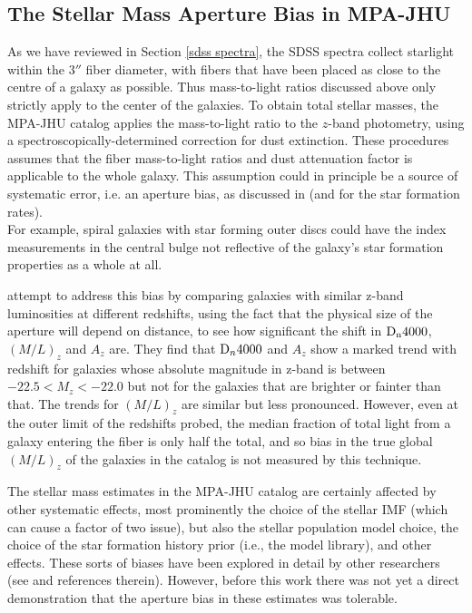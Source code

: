 \subsection{The Stellar Mass Aperture Bias in MPA-JHU}
\label{apercorr}

As we have reviewed in Section \ref{sdss spectra}, the SDSS spectra 
collect starlight within the 3$''$ fiber diameter, with fibers that 
have been placed as close to the centre of a galaxy as possible.
Thus mass-to-light ratios discussed above only strictly apply to the
center of the galaxies.
To obtain total stellar masses, the MPA-JHU catalog 
applies the mass-to-light ratio to the $z$-band photometry, using
a spectroscopically-determined correction for dust extinction.
These procedures assumes that the fiber mass-to-light ratios and 
dust attenuation factor is applicable to the whole galaxy. This
assumption could in principle be a source of systematic error,
i.e. an  aperture bias, as discussed in \citet{kauffmann_stellar_2003} 
(and \citet{brinchmann_physical_2004} for the star formation rates).\\
For example,  spiral galaxies with star forming outer discs could have 
the index measurements in the central bulge not reflective of the 
galaxy's star formation properties as a whole at all. 

\citet{kauffmann_stellar_2003} attempt to address this 
bias by comparing galaxies with similar z-band luminosities 
at different redshifts, using the fact that the physical
size of the aperture will depend on distance,
to see how significant the shift in ${\rm D}_{\rm n}4000$,
$(M/L)_{z}$ and $A_{z}$ are. They find that ${\rm D}_{n}4000$ 
and $A_{z}$ show a marked trend with redshift for galaxies 
whose absolute magnitude in z-band is between 
$-22.5 < M_{z} < -22.0$  but not for the galaxies that are 
brighter or fainter than that. The trends for $(M/L)_{z}$ are 
similar but less pronounced. However, even at the outer limit 
of the redshifts probed, the median fraction of total light 
from a galaxy entering the fiber is only half the total, and 
so bias in the true global $(M/L)_{z}$ of the galaxies in the catalog 
is not measured by this technique. 

The stellar mass estimates in the MPA-JHU catalog are 
certainly affected by other systematic effects, most
prominently the choice of the stellar IMF (which can cause 
a factor of two issue), but also the stellar population 
model choice, the choice of the star formation history prior 
(i.e., the model library), and other effects. These sorts
of biases have been explored in detail by other researchers
(see \citealt{conroy_modeling_2013} and references therein).
However, before this work there was not yet a direct 
demonstration that the aperture bias in these estimates 
was tolerable.

